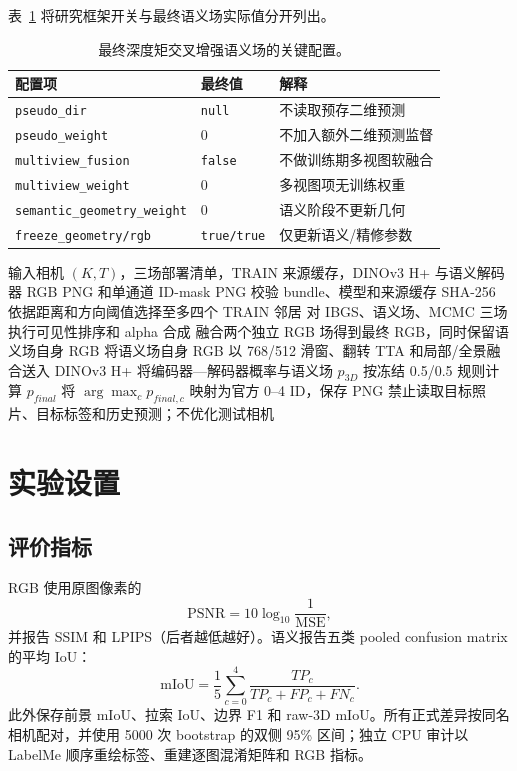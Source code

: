 \documentclass[UTF8,a4paper,11pt]{ctexart}
\newcommand{\mIoU}{\ensuremath{\mathrm{mIoU}}}
\newcommand{\PSNR}{\ensuremath{\mathrm{PSNR}}}
\begin{document}
表~\ref{tab:active-config} 将研究框架开关与最终语义场实际值分开列出。
\begin{table}[t]
\centering
\caption{最终深度矩交叉增强语义场的关键配置。}
\label{tab:active-config}
\begin{tabular}{lll}
\toprule
配置项 & 最终值 & 解释\\
\midrule
\texttt{pseudo\_dir} & \texttt{null} & 不读取预存二维预测\\
\texttt{pseudo\_weight} & 0 & 不加入额外二维预测监督\\
\texttt{multiview\_fusion} & \texttt{false} & 不做训练期多视图软融合\\
\texttt{multiview\_weight} & 0 & 多视图项无训练权重\\
\texttt{semantic\_geometry\_weight} & 0 & 语义阶段不更新几何\\
\texttt{freeze\_geometry/rgb} & \texttt{true/true} & 仅更新语义/精修参数\\
\bottomrule
\end{tabular}
\end{table}

\begin{algorithm}[t]
\caption{相机输入到双输出的部署流程}
\label{alg:deploy}
\begin{algorithmic}[1]
\Require 输入相机 $(K,T)$，三场部署清单，TRAIN 来源缓存，DINOv3 H+ 与语义解码器
\Ensure RGB PNG 和单通道 ID-mask PNG
\State 校验 bundle、模型和来源缓存 SHA-256
\State 依据距离和方向阈值选择至多四个 TRAIN 邻居
\State 对 IBGS、语义场、MCMC 三场执行可见性排序和 alpha 合成
\State 融合两个独立 RGB 场得到最终 RGB，同时保留语义场自身 RGB
\State 将语义场自身 RGB 以 768/512 滑窗、翻转 TTA 和局部/全景融合送入 DINOv3 H+
\State 将编码器—解码器概率与语义场 $p_{3D}$ 按冻结 0.5/0.5 规则计算 $p_{final}$
\State 将 $\arg\max_c p_{final,c}$ 映射为官方 0--4 ID，保存 PNG
\State 禁止读取目标照片、目标标签和历史预测；不优化测试相机
\end{algorithmic}
\end{algorithm}

\section{实验设置}
\subsection{评价指标}
RGB 使用原图像素的
\begin{equation}
\PSNR=10\log_{10}\frac{1}{\mathrm{MSE}},
\end{equation}
并报告 SSIM 和 LPIPS（后者越低越好）。语义报告五类 pooled confusion matrix 的平均 IoU：
\begin{equation}
\mIoU=\frac{1}{5}\sum_{c=0}^{4}\frac{TP_c}{TP_c+FP_c+FN_c}.
\end{equation}
此外保存前景 mIoU、拉索 IoU、边界 F1 和 raw-3D mIoU。所有正式差异按同名相机配对，并使用 5000 次 bootstrap 的双侧 95\% 区间；独立 CPU 审计以 LabelMe 顺序重绘标签、重建逐图混淆矩阵和 RGB 指标。
\end{document}
